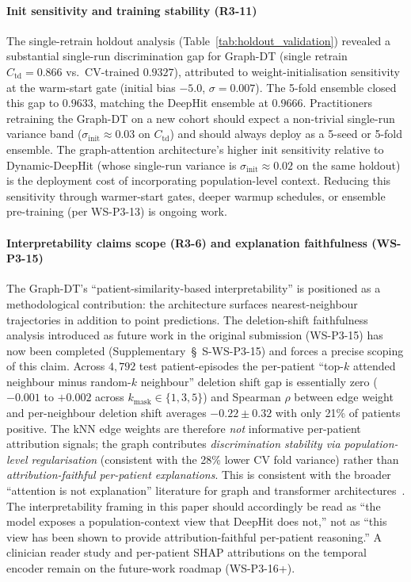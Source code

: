 \documentclass[11pt]{article}
\begin{document}
\paragraph*{Init sensitivity and training stability (R3-11)} The single-retrain holdout analysis (Table~\ref{tab:holdout_validation}) revealed a substantial single-run discrimination gap for Graph-DT (single retrain $C_{\mathrm{td}}{=}0.866$ vs.\ CV-trained $0.9327$), attributed to weight-initialisation sensitivity at the warm-start gate (initial bias $-5.0$, $\sigma{=}0.007$). The 5-fold ensemble closed this gap to $0.9633$, matching the DeepHit ensemble at $0.9666$. Practitioners retraining the Graph-DT on a new cohort should expect a non-trivial single-run variance band ($\sigma_\mathrm{init} \approx 0.03$ on $C_{\mathrm{td}}$) and should always deploy as a 5-seed or 5-fold ensemble. The graph-attention architecture's higher init sensitivity relative to Dynamic-DeepHit (whose single-run variance is $\sigma_\mathrm{init} \approx 0.02$ on the same holdout) is the deployment cost of incorporating population-level context. Reducing this sensitivity through warmer-start gates, deeper warmup schedules, or ensemble pre-training (per WS-P3-13) is ongoing work.

\paragraph*{Interpretability claims scope (R3-6) and explanation faithfulness (WS-P3-15)} The Graph-DT's ``patient-similarity-based interpretability'' is positioned as a methodological contribution: the architecture surfaces nearest-neighbour trajectories in addition to point predictions. The deletion-shift faithfulness analysis introduced as future work in the original submission (WS-P3-15) has now been completed (Supplementary~\S~S-WS-P3-15) and forces a precise scoping of this claim. Across $4{,}792$ test patient-episodes the per-patient ``top-$k$ attended neighbour minus random-$k$ neighbour'' deletion shift gap is essentially zero ($-0.001$ to $+0.002$ across $k_\mathrm{mask}{\in}\{1,3,5\}$) and Spearman $\rho$ between edge weight and per-neighbour deletion shift averages $-0.22 \pm 0.32$ with only 21\% of patients positive. The kNN edge weights are therefore \emph{not} informative per-patient attribution signals; the graph contributes \emph{discrimination stability via population-level regularisation} (consistent with the 28\% lower CV fold variance) rather than \emph{attribution-faithful per-patient explanations}. This is consistent with the broader ``attention is not explanation'' literature for graph and transformer architectures~\cite{jain2019attention,wiegreffe2019attention}. The interpretability framing in this paper should accordingly be read as ``the model exposes a population-context view that DeepHit does not,'' not as ``this view has been shown to provide attribution-faithful per-patient reasoning.'' A clinician reader study and per-patient SHAP attributions on the temporal encoder remain on the future-work roadmap (WS-P3-16+).
\end{document}
